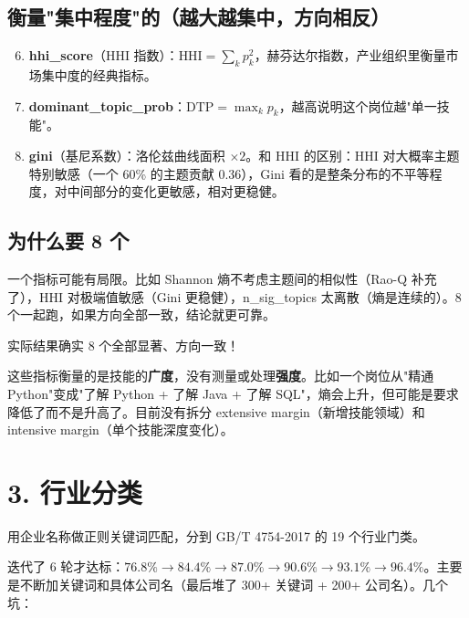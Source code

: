 \documentclass[12pt,a4paper]{article}
\begin{document}
\subsection*{衡量"集中程度"的（越大越集中，方向相反）}

\begin{enumerate}\setcounter{enumi}{5}
  \item \textbf{hhi\_score}（HHI 指数）：$\text{HHI} = \sum_k p_k^2$，赫芬达尔指数，产业组织里衡量市场集中度的经典指标。
  \item \textbf{dominant\_topic\_prob}：$\text{DTP} = \max_k p_k$，越高说明这个岗位越"单一技能"。
  \item \textbf{gini}（基尼系数）：洛伦兹曲线面积 $\times 2$。和 HHI 的区别：HHI 对大概率主题特别敏感（一个 60\% 的主题贡献 0.36），Gini 看的是整条分布的不平等程度，对中间部分的变化更敏感，相对更稳健。
\end{enumerate}

\subsection*{为什么要 8 个}

一个指标可能有局限。比如 Shannon 熵不考虑主题间的相似性（Rao-Q 补充了），HHI 对极端值敏感（Gini 更稳健），n\_sig\_topics 太离散（熵是连续的）。8 个一起跑，如果方向全部一致，结论就更可靠。

实际结果确实 8 个全部显著、方向一致！

\begin{exambox}[局限]
这些指标衡量的是技能的\textbf{广度}，没有测量或处理\textbf{强度}。比如一个岗位从"精通 Python"变成"了解 Python + 了解 Java + 了解 SQL"，熵会上升，但可能是要求降低了而不是升高了。目前没有拆分 extensive margin（新增技能领域）和 intensive margin（单个技能深度变化）。
\end{exambox}

\bigskip

\section*{3. 行业分类}

用企业名称做正则关键词匹配，分到 GB/T 4754-2017 的 19 个行业门类。

迭代了 6 轮才达标：$76.8\% \rightarrow 84.4\% \rightarrow 87.0\% \rightarrow 90.6\% \rightarrow 93.1\% \rightarrow 96.4\%$。主要是不断加关键词和具体公司名（最后堆了 300+ 关键词 + 200+ 公司名）。几个坑：
\end{document}
